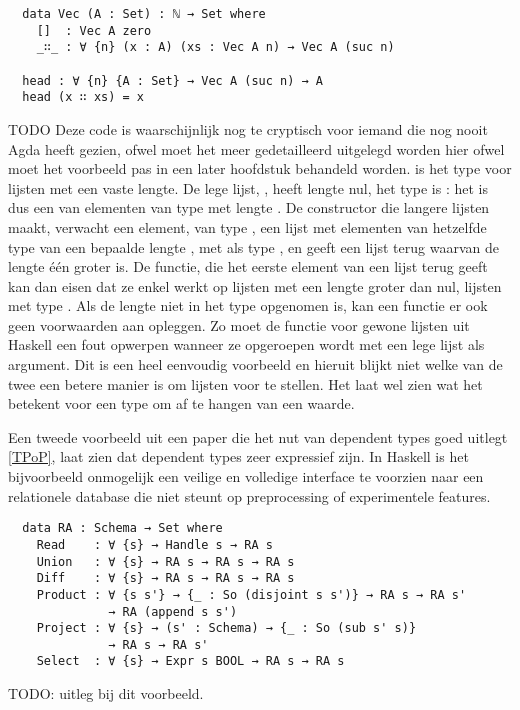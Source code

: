 \begin{verbatim}
  data Vec (A : Set) : ℕ → Set where
    []  : Vec A zero
    _∷_ : ∀ {n} (x : A) (xs : Vec A n) → Vec A (suc n)

  head : ∀ {n} {A : Set} → Vec A (suc n) → A
  head (x ∷ xs) = x
\end{verbatim}

TODO Deze code is waarschijnlijk nog te cryptisch voor iemand die nog nooit
Agda heeft gezien, ofwel moet het meer gedetailleerd uitgelegd worden hier
ofwel moet het voorbeeld pas in een later hoofdstuk behandeld worden.
 is het type voor lijsten met een vaste lengte. De lege lijst,
\iagda{[]}, heeft lengte nul, het type is : het is dus een
 van elementen van type  met lengte . De
constructor die langere lijsten maakt, verwacht een element,  van type
, een lijst met elementen van hetzelfde type  van een
bepaalde lengte ,  met als type , en geeft
een lijst terug waarvan de lengte één groter is. De  functie, die
het eerste element van een lijst terug geeft kan dan eisen dat ze enkel werkt
op lijsten met een lengte groter dan nul, lijsten met type
. Als de lengte niet in het type opgenomen is, kan een
functie er ook geen voorwaarden aan opleggen. Zo moet de  functie
voor gewone lijsten uit Haskell een fout opwerpen wanneer ze opgeroepen wordt
met een lege lijst als argument. Dit is een heel eenvoudig voorbeeld en hieruit
blijkt niet welke van de twee een betere manier is om lijsten voor te stellen.
Het laat wel zien wat het betekent voor een type om af te hangen van een waarde.

Een tweede voorbeeld uit een paper die het nut van dependent types goed uitlegt
\ref{TPoP}, laat zien dat dependent types zeer expressief zijn. In Haskell is
het bijvoorbeeld onmogelijk een veilige en volledige interface te voorzien naar
een relationele database die niet steunt op preprocessing of experimentele
features.

\begin{verbatim}
  data RA : Schema → Set where
    Read    : ∀ {s} → Handle s → RA s
    Union   : ∀ {s} → RA s → RA s → RA s
    Diff    : ∀ {s} → RA s → RA s → RA s
    Product : ∀ {s s'} → {_ : So (disjoint s s')} → RA s → RA s'
              → RA (append s s')
    Project : ∀ {s} → (s' : Schema) → {_ : So (sub s' s)}
              → RA s → RA s'
    Select  : ∀ {s} → Expr s BOOL → RA s → RA s
\end{verbatim}

TODO: uitleg bij dit voorbeeld.
